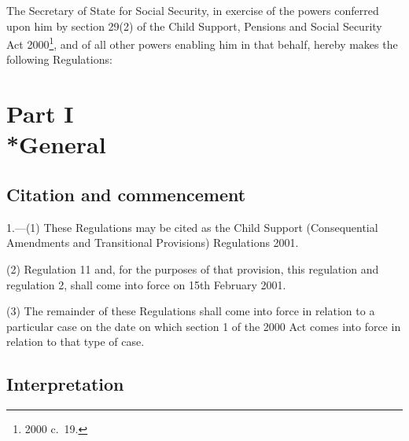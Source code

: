 \documentclass[12pt,a4paper]{article}
\title{\regstitle}
\author{S.I.\ 2001 No.\ 158}
\date{Made
24th January 2001\\
Laid before Parliament
25th January 2001\\
Coming into force
as provided in regulation 1(2) and (3)
}
\begin{document}
\maketitle

\noindent
The Secretary of State for Social Security, in exercise of the powers conferred upon him by section 29(2) of the Child Support, Pensions and Social Security Act 2000\footnote{2000 c.\ 19.}, and of all other powers enabling him in that behalf, hereby makes the following Regulations: 

\enlargethispage{\baselineskip}

{\sloppy

\tableofcontents

}

\bigskip

\setcounter{secnumdepth}{-2}

\section[Part I --- General]{Part I\\*General}

\renewcommand\parthead{--- Part I}

\subsection[1. Citation and commencement]{Citation and commencement}

1.---(1)  These Regulations may be cited as the Child Support (Consequential Amendments and Transitional Provisions) Regulations 2001.

(2) Regulation 11 and, for the purposes of that provision, this regulation and regulation 2, shall come into force on 15th February 2001.

(3) The remainder of these Regulations shall come into force in relation to a particular case on the date on which section 1 of the 2000 Act comes into force in relation to that type of case.

\subsection[2. Interpretation]{Interpretation}
\end{document}
